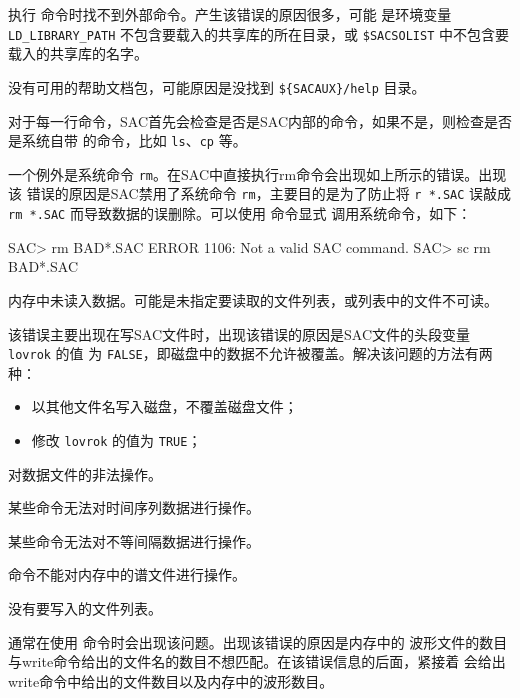 执行  命令时找不到外部命令。产生该错误的原因很多，可能
是环境变量 \verb|LD_LIBRARY_PATH| 不包含要载入的共享库的所在目录，或
\verb|$SACSOLIST| 中不包含要载入的共享库的名字。

没有可用的帮助文档包，可能原因是没找到 \verb|${SACAUX}/help| 目录。

对于每一行命令，SAC首先会检查是否是SAC内部的命令，如果不是，则检查是否是系统自带
的命令，比如 \texttt{ls}、\texttt{cp} 等。

一个例外是系统命令 \texttt{rm}。在SAC中直接执行rm命令会出现如上所示的错误。出现该
错误的原因是SAC禁用了系统命令 \texttt{rm}，主要目的是为了防止将 \texttt{r *.SAC} 误敲成
\texttt{rm *.SAC} 而导致数据的误删除。可以使用  命令显式
调用系统命令，如下：
\begin{SACCode}
SAC> rm BAD*.SAC
 ERROR 1106: Not a valid SAC command.
SAC> sc rm BAD*.SAC
\end{SACCode}

内存中未读入数据。可能是未指定要读取的文件列表，或列表中的文件不可读。

该错误主要出现在写SAC文件时，出现该错误的原因是SAC文件的头段变量 \texttt{lovrok} 的值
为 \texttt{FALSE}，即磁盘中的数据不允许被覆盖。解决该问题的方法有两种：
\begin{itemize}
\item 以其他文件名写入磁盘，不覆盖磁盘文件；
\item 修改 \texttt{lovrok} 的值为 \texttt{TRUE}；
\end{itemize}

对数据文件的非法操作。

某些命令无法对时间序列数据进行操作。

某些命令无法对不等间隔数据进行操作。

命令不能对内存中的谱文件进行操作。

没有要写入的文件列表。

通常在使用  命令时会出现该问题。出现该错误的原因是内存中的
波形文件的数目与write命令给出的文件名的数目不想匹配。在该错误信息的后面，紧接着
会给出write命令中给出的文件数目以及内存中的波形数目。

